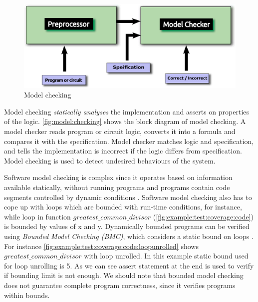 \begin{figure}[h]
    \centering
\includegraphics[width=\linewidth]{images/modelChecking.pdf}
   \caption{Model checking \cite{clarke2008birth}}
   \label{fig:model:checking}
\end{figure}

Model checking \emph{statically analyses} the implementation and asserts on properties of the logic. \autoref{fig:model:checking} shows the block diagram of model checking. A model checker reads program or circuit logic, converts it into a formula and compares it with the specification. Model checker matches logic and specification, and tells the implementation is incorrect if the logic differs from specification. Model checking is used to detect undesired behaviours of the system.

Software model checking is complex since it operates based on information available statically, without running programs and programs contain code segments controlled by dynamic conditions \cite{godefroid2005software}. Software model checking also has to cope up with loops which are bounded with run-time conditions, for instance, while loop in function $greatest\_common\_divisor$ (\autoref{fig:example:test:coverage:code}) is bounded by values of x and y. Dynamically bounded programs can be verified using \emph{Bounded Model Checking (BMC)}, which considers a static bound on loops \cite{biere2003bounded}. For instance \autoref{fig:example:test:coverage:code:loopunrolled} shows $greatest\_common\_divisor$ with loop unrolled. In this example static bound used for loop unrolling is 5. As we can see assert statement at the end is used to verify if bounding limit is not enough. We should note that bounded model checking does not guarantee complete program correctness, since it verifies programs within bounds.


